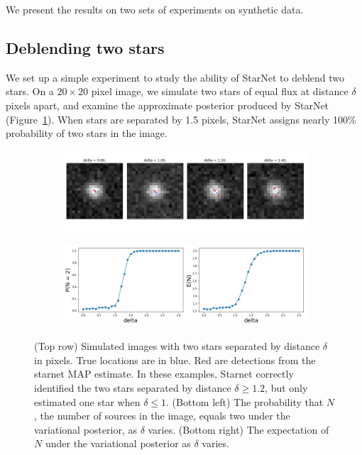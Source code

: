 
We present the results on two sets of experiments on synthetic data.

\subsection{Deblending two stars}

We set up a simple experiment to study the
ability of StarNet to deblend two stars.
On a $20\times20$ pixel image,
we simulate two stars of equal flux at distance $\delta$ pixels apart, and
examine the approximate posterior produced by StarNet (Figure~\ref{fig:deblending_fig}).
When stars are separated by 1.5 pixels, StarNet assigns nearly 100\% probability
of two stars in the image.

\begin{figure}[tb]
    \centering
    \begin{subfigure}{0.8\textwidth}
        \includegraphics[width=\textwidth]{figures/deblending/example_deblending.png}
    \end{subfigure}
    \begin{subfigure}{0.8\textwidth}
        \includegraphics[width=\textwidth]{figures/deblending/summary_statistics.png}
    \end{subfigure}
    \caption{(Top row) Simulated images with two stars separated by distance $\delta$ in pixels.
    True locations are in blue. Red are detections from the starnet MAP estimate.
    In these examples, Starnet correctly identified the two stars separated by distance $\delta \geq 1.2$,
    but only estimated one star when $\delta \leq 1$.
    (Bottom left) The probability that $N$, the number of sources in the image, equals two
    under the variational posterior, as $\delta$ varies.
    (Bottom right) The expectation of $N$ under the variational posterior as $\delta$ varies. }
    \label{fig:deblending_fig}
\end{figure}

